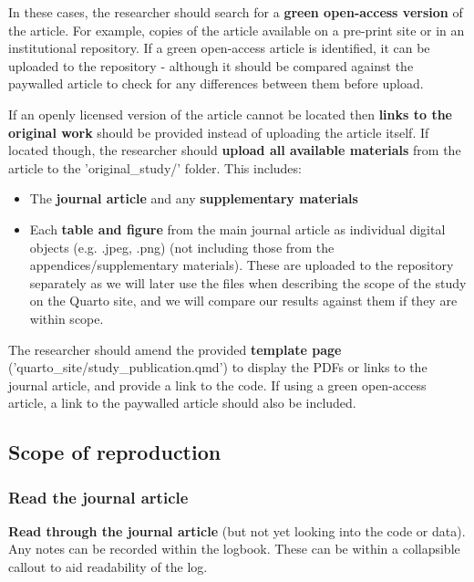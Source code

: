 In these cases, the researcher should search for a \textbf{green open-access version} of the article. For example, copies of the article available on a pre-print site or in an institutional repository. If a green open-access article is identified, it can be uploaded to the repository - although it should be compared against the paywalled article to check for any differences between them before upload.

If an openly licensed version of the article cannot be located then \textbf{links to the original work} should be provided instead of uploading the article itself. If located though, the researcher should \textbf{upload all available materials} from the article to the 'original\_study/' folder. This includes:
\begin{itemize}
    \item The \textbf{journal article} and any \textbf{supplementary materials}
    \item Each \textbf{table and figure} from the main journal article as individual digital objects (e.g. .jpeg, .png) (not including those from the appendices/supplementary materials). These are uploaded to the repository separately as we will later use the files when describing the scope of the study on the Quarto site, and we will compare our results against them if they are within scope.
\end{itemize}

The researcher should amend the provided \textbf{template page} ('quarto\_site/study\_publication.qmd') to display the PDFs or links to the journal article, and provide a link to the code. If using a green open-access article, a link to the paywalled article should also be included.

\vspace{0.5cm}
\subsection{Scope of reproduction}

\subsubsection{Read the journal article}

\textbf{Read through the journal article} (but not yet looking into the code or data). Any notes can be recorded within the logbook. These can be within a collapsible callout to aid readability of the log.

\vspace{0.5cm}
